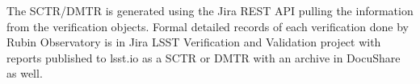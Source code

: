 The SCTR/DMTR is generated using the Jira REST API pulling the information from the verification objects. Formal detailed records of each verification done by Rubin Observatory is in Jira LSST Verification and Validation project with reports published to lsst.io as a SCTR or DMTR with an archive in DocuShare as well.
